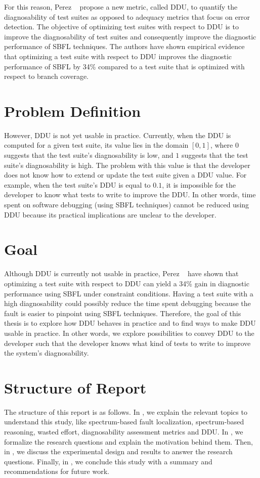 \documentclass[twoside,a4paper,11pt]{memoir}
\begin{document}
For this reason, Perez \etal~\cite{DBLP:conf/icse/PerezAD17} propose a new metric, called DDU, to quantify the diagnosability of test suites as opposed to adequacy metrics that focus on error detection.
The objective of optimizing test suites with respect to DDU is to improve the diagnosability of test suites and consequently improve the diagnostic performance of SBFL techniques.
The authors have shown empirical evidence that optimizing a test suite with respect to DDU improves the diagnostic performance of SBFL by 34\% compared to a test suite that is optimized with respect to branch coverage.

\section{Problem Definition}%
\label{sec:problem_definition}
However, DDU is not yet usable in practice.
Currently, when the DDU is computed for a given test suite, its value lies in the domain \([ 0, 1 ]\), where \(0\) suggests that the test suite's diagnosability is low, and \(1\) suggests that the test suite's diagnosability is high.
The problem with this value is that the developer does not know how to extend or update the test suite given a DDU value.
For example, when the test suite's DDU is equal to \(0.1\), it is impossible for the developer to know what tests to write to improve the DDU\@.
In other words, time spent on software debugging (using SBFL techniques) cannot be reduced using DDU because its practical implications are unclear to the developer.

\section{Goal}
Although DDU is currently not usable in practice, Perez \etal~\cite{DBLP:conf/icse/PerezAD17} have shown that optimizing a test suite with respect to DDU can yield a 34\% gain in diagnostic performance using SBFL under constraint conditions\@.
Having a test suite with a high diagnosability could possibly reduce the time spent debugging because the fault is easier to pinpoint using SBFL techniques.
Therefore, the goal of this thesis is to explore how DDU behaves in practice and to find ways to make DDU usable in practice.
In other words, we explore possibilities to convey DDU to the developer such that the developer knows what kind of tests to write to improve the system's diagnosability.

\section{Structure of Report}
The structure of this report is as follows.
In , we explain the relevant topics to understand this study, like spectrum-based fault localization, spectrum-based reasoning, wasted effort, diagnosability assessment metrics and DDU\@.
In , we formalize the research questions and explain the motivation behind them.
Then, in , we discuss the experimental design and results to answer the research questions.
Finally, in , we conclude this study with a summary and recommendations for future work.
\end{document}
